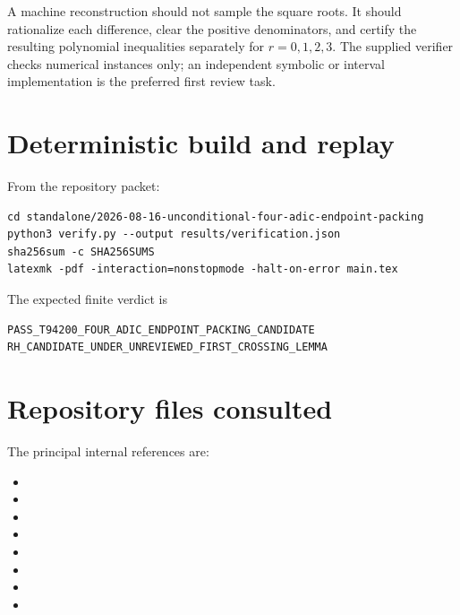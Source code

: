 \documentclass[11pt]{article}
\begin{document}
A machine reconstruction should not sample the square roots. It should rationalize each difference, clear the positive denominators, and certify the resulting polynomial inequalities separately for $r=0,1,2,3$. The supplied verifier checks numerical instances only; an independent symbolic or interval implementation is the preferred first review task.

\section{Deterministic build and replay}

From the repository packet:
\begin{lstlisting}[basicstyle=\ttfamily\small,backgroundcolor=\color{lightgray},frame=single]
cd standalone/2026-08-16-unconditional-four-adic-endpoint-packing
python3 verify.py --output results/verification.json
sha256sum -c SHA256SUMS
latexmk -pdf -interaction=nonstopmode -halt-on-error main.tex
\end{lstlisting}
The expected finite verdict is
\begin{lstlisting}[basicstyle=\ttfamily\small,backgroundcolor=\color{lightgray},frame=single]
PASS_T94200_FOUR_ADIC_ENDPOINT_PACKING_CANDIDATE
RH_CANDIDATE_UNDER_UNREVIEWED_FIRST_CROSSING_LEMMA
\end{lstlisting}

\section{Repository files consulted}

The principal internal references are:
\begin{itemize}
\item {}
\item {}
\item {}
\item {}
\item {}
\item {}
\item {}
\item {}
\end{itemize}
\end{document}
